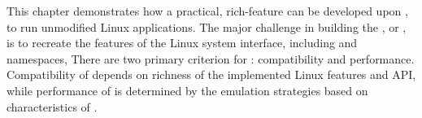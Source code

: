 This chapter
demonstrates how a practical, rich-feature \libos{} can be developed upon
\thehostabi{},
to run unmodified Linux applications.
The major challenge in building the \graphene{} \libos{},
or \thelibos{},
is to recreate the features of the Linux system interface, including
\linuxapis{} and namespaces, %
There are two
primary criterion for \thelibos{}:
compatibility and performance.
Compatibility of \thelibos{} depends on
richness of the implemented Linux features and API,
while performance of \thelibos{} is determined
by the emulation strategies
based on characteristics of \thehostabi{}.





